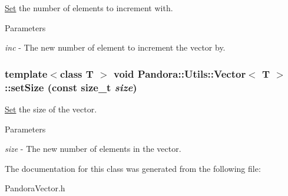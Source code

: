 \hyperlink{classPandora_1_1Utils_1_1Set}{Set} the number of elements to increment with. 
\begin{DoxyParams}{Parameters}
\item[{\em inc}]-\/ The new number of element to increment the vector by. \end{DoxyParams}
\hypertarget{classPandora_1_1Utils_1_1Vector_adc9658f8a19f67e7e92b43c5bd4206c7}{
\subsubsection[{setSize}]{\setlength{\rightskip}{0pt plus 5cm}template$<$class T $>$ void {\bf Pandora::Utils::Vector}$<$ T $>$::setSize (const size\_\-t {\em size})}}
\label{classPandora_1_1Utils_1_1Vector_adc9658f8a19f67e7e92b43c5bd4206c7}


\hyperlink{classPandora_1_1Utils_1_1Set}{Set} the size of the vector. 
\begin{DoxyParams}{Parameters}
\item[{\em size}]-\/ The new number of elements in the vector. \end{DoxyParams}


The documentation for this class was generated from the following file:\begin{DoxyCompactItemize}
\item 
PandoraVector.h\end{DoxyCompactItemize}
